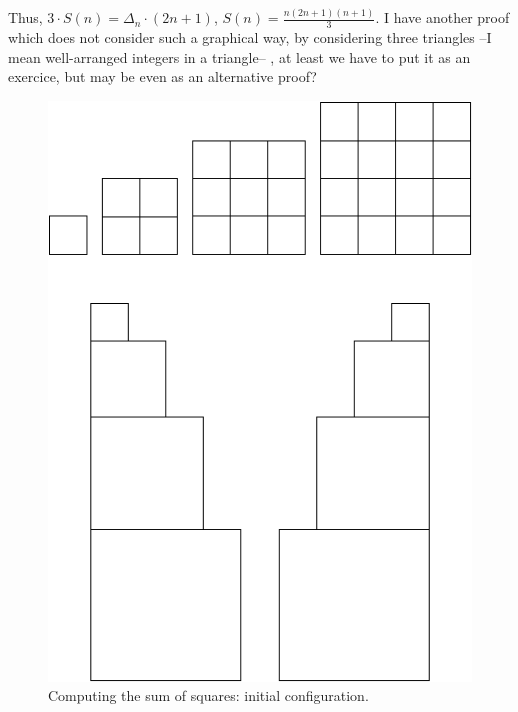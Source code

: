 {Thus, $3 \cdot S(n) = \Delta_n \cdot (2n+1)$, $S(n) = \frac{n(2n+1)(n+1)}{3}$.
{\Denis I have another proof which does not consider such a graphical way, by considering three triangles --I mean well-arranged integers in a triangle-- , 
at least we have to put it as an exercice,
but may be even as an alternative proof?}
\begin{figure}[ht]
\begin{center}
       \includegraphics[scale=0.4]{FiguresMaths/SumSquares1}
\caption{Computing the sum of squares: initial configuration.}
       \label{fig:sumSquares1}
\end{center}
\end{figure}
\begin{figure}[ht]
\begin{center}

\end{center}
\end{figure}}
